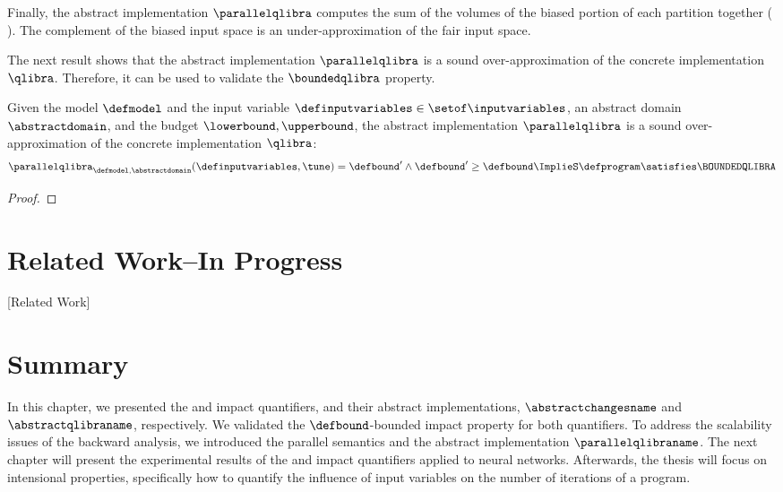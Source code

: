 {Finally, the abstract implementation $\parallelqlibra$ computes the sum of the volumes of the biased portion of each partition together (\cf{} ).
The complement of the biased input space is an under-approximation of the fair input space.

The next result shows that the abstract implementation $\parallelqlibra$ is a sound over-approximation of the concrete implementation $\qlibra$.
Therefore, it can be used to validate the $\boundedqlibra$ property.

\begin{theorem}
  Given the model $\defmodel$ and the input variable $\definputvariables\in\setof\inputvariables$, an abstract domain $\abstractdomain$, and the budget $\lowerbound, \upperbound$, the abstract implementation $\parallelqlibra$ is a sound over-approximation of the concrete implementation $\qlibra$:
  \begin{align*}
    \parallelqlibra_{\defmodel, \abstractdomain}(\definputvariables, \tune) = \defbound' \land \defbound' \ge \defbound \ImplieS \defprogram \satisfies \BOUNDEDQLIBRA
  \end{align*}
\end{theorem}
\begin{proof}
\end{proof}

} %

\section{Related Work--In Progress}[Related Work]

\section{Summary}

In this chapter, we presented the \changesname{} and \qlibraname{} impact quantifiers, and their abstract implementations, $\abstractchangesname$ and $\abstractqlibraname$, respectively.
We validated the $\defbound$-bounded impact property for both quantifiers.
To address the scalability issues of the backward analysis, we introduced the parallel semantics and the abstract implementation $\parallelqlibraname$.
The next chapter will present the experimental results of the \changesname{} and \qlibraname{} impact quantifiers applied to neural networks.
Afterwards, the thesis will focus on intensional properties, specifically how to quantify the influence of input variables on the number of iterations of a program.


